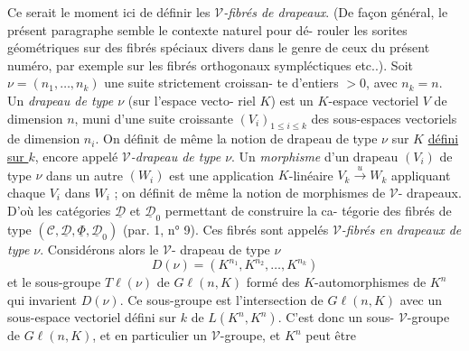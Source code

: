 Ce serait le moment ici de définir les \emph{$\mathcal{V}$-fibrés de drapeaux}. (De
façon général, le présent paragraphe semble le contexte naturel pour dé-
rouler les sorites géométriques sur des fibrés spéciaux divers dans le
genre de ceux du présent numéro, par exemple sur les fibrés orthogonaux
sympléctiques etc..). Soit $\nu = (n_1, \dots, n_k)$ une suite strictement croissan-
te d'entiers $>0$, avec $n_k = n$. Un \emph{drapeau de type $\nu$} (sur l'espace vecto-
riel $K$) est un $K$-espace vectoriel $V$ de dimension $n$, muni d'une suite
croissante $(V_i)_{1 \le i \le k}$ des sous-espaces vectoriels de dimension $n_i$. On
définit de même la notion de drapeau de type $\nu$ sur $K$ \underline{défini sur $k$}, encore
appelé \emph{$\mathcal{V}$-drapeau de type $\nu$}. Un \emph{morphisme} d'un drapeau $(V_i)$ de type $\nu$
dans un autre $(W_i)$ est une application $K$-linéaire $V_k \xrightarrow{u} W_k$ appliquant
chaque $V_i$ dans $W_i$ ; on définit de même la notion de morphismes de $\mathcal{V}$-
drapeaux. D'où les catégories $\underline{\mathcal{D}}$ et $\underline{\mathcal{D}}_0$ permettant de construire la ca-
tégorie des fibrés de type $(\mathcal{C}, \underline{\mathcal{D}}, \underline{\Phi}, \underline{\mathcal{D}}_0)$ (par. 1, n° 9). Ces fibrés sont
appelés \emph{$\mathcal{V}$-fibrés en drapeaux de type $\nu$}. Considérons alors le $\mathcal{V}$-
drapeau de type $\nu$
$$D(\nu) = (K^{n_1}, K^{n_2}, \dots, K^{n_k})$$
et le sous-groupe $T\ell(\nu)$ de $G\ell(n,K)$ formé des $K$-automorphismes de $K^n$
qui invarient $D(\nu)$. Ce sous-groupe est l'intersection de $G\ell(n,K)$ avec
un sous-espace vectoriel défini sur $k$ de $L(K^n,K^n)$. C'est donc un sous-
$\mathcal{V}$-groupe de $G\ell(n,K)$, et en particulier un $\mathcal{V}$-groupe, et $K^n$ peut être

\newpage


